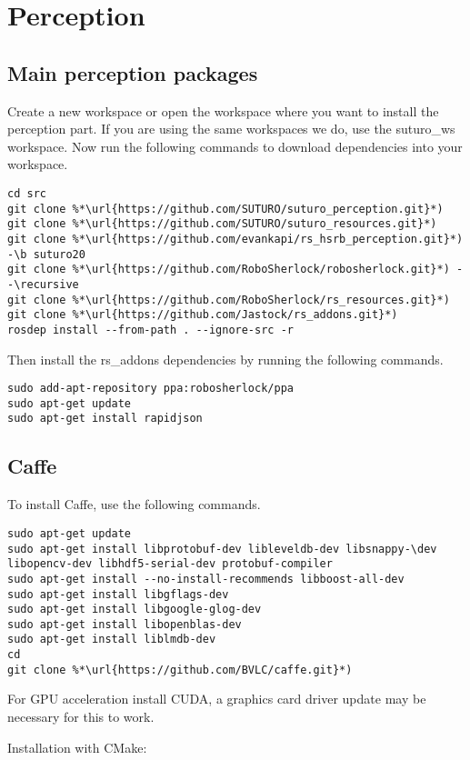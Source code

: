 \documentclass[main.tex]{subfiles}
\begin{document}
 \section{Perception}
 \subsection{Main perception packages}
 Create a new workspace or open the workspace where you want to install the perception part. If you are using the same workspaces we do, use the suturo\_ws workspace. Now run the following commands to download dependencies into your workspace.
 
 \begin{lstlisting}
cd src
git clone %*\url{https://github.com/SUTURO/suturo_perception.git}*)
git clone %*\url{https://github.com/SUTURO/suturo_resources.git}*) 
git clone %*\url{https://github.com/evankapi/rs_hsrb_perception.git}*) -\b suturo20
git clone %*\url{https://github.com/RoboSherlock/robosherlock.git}*) --\recursive
git clone %*\url{https://github.com/RoboSherlock/rs_resources.git}*)
git clone %*\url{https://github.com/Jastock/rs_addons.git}*)
rosdep install --from-path . --ignore-src -r 
\end{lstlisting}
 
 Then install the rs\_addons dependencies by running the following commands.
 \begin{lstlisting}
sudo add-apt-repository ppa:robosherlock/ppa
sudo apt-get update
sudo apt-get install rapidjson 
\end{lstlisting}
 
\subsection{Caffe}
To install Caffe, use the following commands.
 \begin{lstlisting}
sudo apt-get update
sudo apt-get install libprotobuf-dev libleveldb-dev libsnappy-\dev libopencv-dev libhdf5-serial-dev protobuf-compiler
sudo apt-get install --no-install-recommends libboost-all-dev
sudo apt-get install libgflags-dev
sudo apt-get install libgoogle-glog-dev
sudo apt-get install libopenblas-dev
sudo apt-get install liblmdb-dev
cd 
git clone %*\url{https://github.com/BVLC/caffe.git}*)
\end{lstlisting}
 
 For GPU acceleration install CUDA, a graphics card driver update may be necessary for this to work.
 
 Installation with CMake:\\
 
\end{document}
